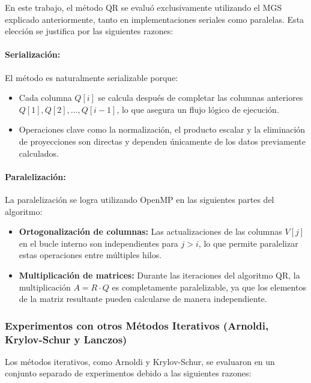 \documentclass{article}
\begin{document}
En este trabajo, el método QR se evaluó exclusivamente utilizando el MGS explicado anteriormente, tanto en implementaciones seriales como paralelas. Esta elección se justifica por las siguientes razones:

\paragraph{Serialización:} El método es naturalmente serializable porque:
\begin{itemize}
    \item Cada columna $Q[i]$ se calcula después de completar las columnas anteriores $Q[1], Q[2], \dots, Q[i-1]$, lo que asegura un flujo lógico de ejecución.
    \item Operaciones clave como la normalización, el producto escalar y la eliminación de proyecciones son directas y dependen únicamente de los datos previamente calculados.
\end{itemize}

\paragraph{Paralelización:} La paralelización se logra utilizando OpenMP en las siguientes partes del algoritmo:
\begin{itemize}
    \item \textbf{Ortogonalización de columnas:} Las actualizaciones de las columnas $V[j]$ en el bucle interno son independientes para $j > i$, lo que permite paralelizar estas operaciones entre múltiples hilos.
    \item \textbf{Multiplicación de matrices:} Durante las iteraciones del algoritmo QR, la multiplicación $A = R \cdot Q$ es completamente paralelizable, ya que los elementos de la matriz resultante pueden calcularse de manera independiente.
\end{itemize}


\subsubsection{Experimentos con otros Métodos Iterativos (Arnoldi, Krylov-Schur y Lanczos)}

Los métodos iterativos, como Arnoldi y Krylov-Schur, se evaluaron en un conjunto separado de experimentos debido a las siguientes razones:
\end{document}
